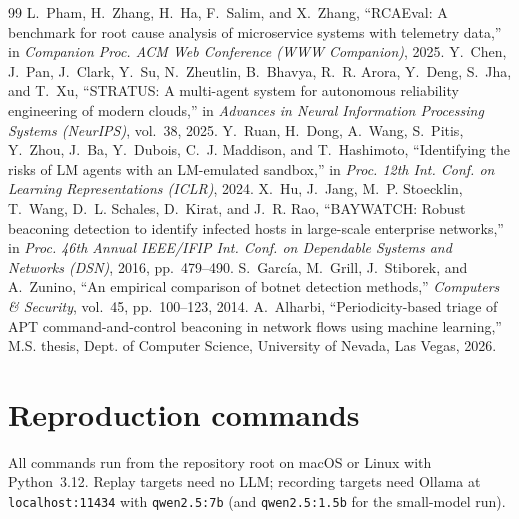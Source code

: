 \documentclass[11pt,a4paper]{article}
\newcommand{\code}[1]{\texttt{#1}}
\begin{document}
\begin{thebibliography}{99}
 L.~Pham, H.~Zhang, H.~Ha, F.~Salim, and X.~Zhang, ``RCAEval: A benchmark for root cause analysis of microservice systems with telemetry data,'' in \emph{Companion Proc. ACM Web Conference (WWW Companion)}, 2025.
 Y.~Chen, J.~Pan, J.~Clark, Y.~Su, N.~Zheutlin, B.~Bhavya, R.~R. Arora, Y.~Deng, S.~Jha, and T.~Xu, ``STRATUS: A multi-agent system for autonomous reliability engineering of modern clouds,'' in \emph{Advances in Neural Information Processing Systems (NeurIPS)}, vol.~38, 2025.
 Y.~Ruan, H.~Dong, A.~Wang, S.~Pitis, Y.~Zhou, J.~Ba, Y.~Dubois, C.~J. Maddison, and T.~Hashimoto, ``Identifying the risks of LM agents with an LM-emulated sandbox,'' in \emph{Proc. 12th Int. Conf. on Learning Representations (ICLR)}, 2024.
 X.~Hu, J.~Jang, M.~P. Stoecklin, T.~Wang, D.~L. Schales, D.~Kirat, and J.~R. Rao, ``BAYWATCH: Robust beaconing detection to identify infected hosts in large-scale enterprise networks,'' in \emph{Proc. 46th Annual IEEE/IFIP Int. Conf. on Dependable Systems and Networks (DSN)}, 2016, pp.~479--490.
 S.~Garc\'ia, M.~Grill, J.~Stiborek, and A.~Zunino, ``An empirical comparison of botnet detection methods,'' \emph{Computers \& Security}, vol.~45, pp.~100--123, 2014.
 A.~Alharbi, ``Periodicity-based triage of APT command-and-control beaconing in network flows using machine learning,'' M.S. thesis, Dept. of Computer Science, University of Nevada, Las Vegas, 2026.
\end{thebibliography}

\appendix
\section{Reproduction commands}
\label{app:repro}
All commands run from the repository root on macOS or Linux with Python~3.12. Replay targets need no
LLM; recording targets need Ollama at \code{localhost:11434} with \code{qwen2.5:7b}
(and \code{qwen2.5:1.5b} for the small-model run).
\end{document}

